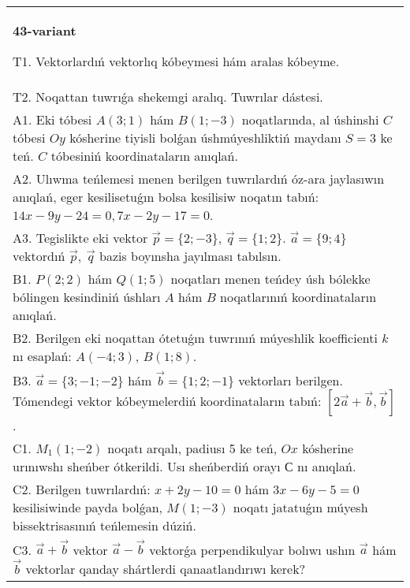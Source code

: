 \documentclass{article}
\begin{document}
\begin{tabular}{m{17cm}}
\textbf{43-variant}
\newline

T1. 
Vektorlardıń vektorlıq kóbeymesi hám aralas kóbeyme.
 \\
T2. 
Noqattan tuwrıǵa shekemgi aralıq. Tuwrılar dástesi.
 \\
A1. 
Eki tóbesi $A(3;1)$ hám $B(1;-3)$ noqatlarında, al
úshinshi $C$ tóbesi $Oy$ kósherine tiyisli bolǵan úshmúyeshliktiń
maydanı $S=3$ ke teń. $C$ tóbesiniń koordinataların anıqlań.
 \\
A2. 
Ulıwma teńlemesi menen berilgen tuwrılardıń      
óz-ara jaylasıwın anıqlań, eger kesilisetuǵın bolsa kesilisiw noqatın 
tabıń: $14x-9y-24=0, 7x-2y-17=0$.
 \\
A3. 
Tegislikte eki vektor
$\overrightarrow{p} = \{ 2; - 3\}$, $\overrightarrow{q} = \{ 1;2\}$.
$\overrightarrow{a} = \{9;4\}$ vektordıń
$\overrightarrow{p},\ \overrightarrow{q}$ bazis boyınsha jayılması tabılsın.
 \\
B1. 
\(P(2;2)\) hám \(Q(1;5)\) noqatları menen teńdey úsh
bólekke bólingen kesindiniń úshları $A$ hám $B$ noqatlarınıń
koordinataların anıqlań.
 \\
B2. 
Berilgen eki noqattan ótetuǵın tuwrınıń múyeshlik
koefficienti $k$ nı esaplań: $A(-4;3)$, $B(1;8)$.
 \\
B3. 
$\vec{a} = \{ 3; - 1; - 2\}$ hám $\vec{b} = \{ 1;2; - 1\}$ vektorları berilgen. Tómendegi vektor kóbeymelerdiń koordinataların tabıń: 
$\left\lbrack 2\vec{a} + \vec{b},\vec{b} \right\rbrack$.
 \\
C1. 
\(M_{1}(1; - 2)\) noqatı arqalı, padiusı 5 ke teń,
$Ox$ kósherine urınıwshı sheńber ótkerildi. Usı sheńberdiń orayı
$С$ nı anıqlań.
 \\
C2. 
Berilgen tuwrılardıń:
\(x + 2y - 10 = 0\) hám \(3x - 6y - 5 = 0\) kesilisiwinde payda
bolǵan, \(M(1; - 3)\) noqatı jatatuǵın múyesh bissektrisasınıń
teńlemesin dúziń.
 \\
C3. 
\(\vec{a} + \vec{b}\) vektor \(\vec{a} - \vec{b}\) vektorǵa perpendikulyar bolıwı ushın \(\vec{a}\) hám \(\vec{b}\) vektorlar qanday shártlerdi qanaatlandırıwı kerek?
 \\

\end{tabular}
\vspace{1cm}
\end{document}
